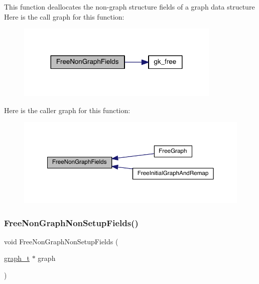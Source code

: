 This function deallocates the non-\/graph structure fields of a graph data structure Here is the call graph for this function\+:\nopagebreak
\begin{figure}[H]
\begin{center}
\leavevmode
\includegraphics[width=276pt]{a00951_a0ff13bda23f95ec19bb263ef036cd109_cgraph}
\end{center}
\end{figure}
Here is the caller graph for this function\+:\nopagebreak
\begin{figure}[H]
\begin{center}
\leavevmode
\includegraphics[width=350pt]{a00951_a0ff13bda23f95ec19bb263ef036cd109_icgraph}
\end{center}
\end{figure}
\mbox{\label{a00951_a7f1865a64a8a13def4eacf3d253f970a}} 
\subsubsection{\texorpdfstring{Free\+Non\+Graph\+Non\+Setup\+Fields()}{FreeNonGraphNonSetupFields()}}
{\footnotesize\ttfamily void Free\+Non\+Graph\+Non\+Setup\+Fields (\begin{DoxyParamCaption}\item[{\hyperlink{a00734}{graph\+\_\+t} $\ast$}]{graph }\end{DoxyParamCaption})}

